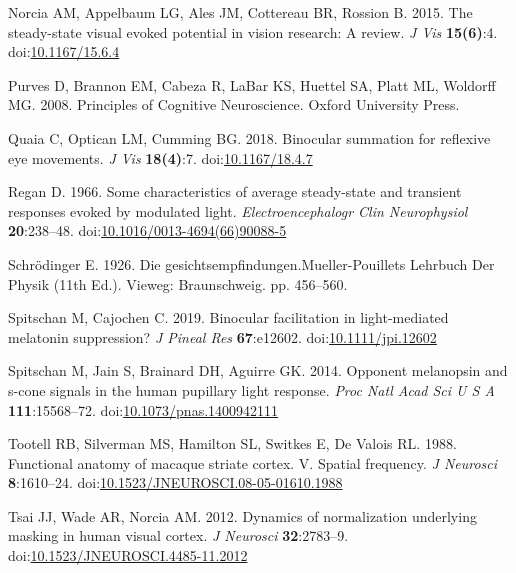 \documentclass[
]{article}
\newlength{\cslhangindent}
\newlength{\cslentryspacingunit} %
\newenvironment{CSLReferences}[2] %
 {%
  \setlength{\parindent}{0pt}
  \ifodd #1
  \let\oldpar\par
  \def\par{\hangindent=\cslhangindent\oldpar}
  \fi
  \setlength{\parskip}{#2\cslentryspacingunit}
 }%
 {}
\begin{document}
\begin{CSLReferences}{1}{0}
\leavevmode{}%
Norcia AM, Appelbaum LG, Ales JM, Cottereau BR, Rossion B. 2015. The steady-state visual evoked potential in vision research: A review. \emph{J Vis} \textbf{15(6)}:4. doi:\href{https://doi.org/10.1167/15.6.4}{10.1167/15.6.4}

\leavevmode{}%
Purves D, Brannon EM, Cabeza R, LaBar KS, Huettel SA, Platt ML, Woldorff MG. 2008. Principles of {Cognitive} {Neuroscience}. Oxford University Press.

\leavevmode{}%
Quaia C, Optican LM, Cumming BG. 2018. Binocular summation for reflexive eye movements. \emph{J Vis} \textbf{18(4)}:7. doi:\href{https://doi.org/10.1167/18.4.7}{10.1167/18.4.7}

\leavevmode{}%
Regan D. 1966. Some characteristics of average steady-state and transient responses evoked by modulated light. \emph{Electroencephalogr Clin Neurophysiol} \textbf{20}:238--48. doi:\href{https://doi.org/10.1016/0013-4694(66)90088-5}{10.1016/0013-4694(66)90088-5}

\leavevmode{}%
Schrödinger E. 1926. Die gesichtsempfindungen.Mueller-Pouillets Lehrbuch Der Physik (11th Ed.). Vieweg: Braunschweig. pp. 456--560.

\leavevmode{}%
Spitschan M, Cajochen C. 2019. Binocular facilitation in light-mediated melatonin suppression? \emph{J Pineal Res} \textbf{67}:e12602. doi:\href{https://doi.org/10.1111/jpi.12602}{10.1111/jpi.12602}

\leavevmode{}%
Spitschan M, Jain S, Brainard DH, Aguirre GK. 2014. Opponent melanopsin and s-cone signals in the human pupillary light response. \emph{Proc Natl Acad Sci U S A} \textbf{111}:15568--72. doi:\href{https://doi.org/10.1073/pnas.1400942111}{10.1073/pnas.1400942111}

\leavevmode{}%
Tootell RB, Silverman MS, Hamilton SL, Switkes E, De Valois RL. 1988. Functional anatomy of macaque striate cortex. V. Spatial frequency. \emph{J Neurosci} \textbf{8}:1610--24. doi:\href{https://doi.org/10.1523/JNEUROSCI.08-05-01610.1988}{10.1523/JNEUROSCI.08-05-01610.1988}

\leavevmode{}%
Tsai JJ, Wade AR, Norcia AM. 2012. Dynamics of normalization underlying masking in human visual cortex. \emph{J Neurosci} \textbf{32}:2783--9. doi:\href{https://doi.org/10.1523/JNEUROSCI.4485-11.2012}{10.1523/JNEUROSCI.4485-11.2012}


\end{CSLReferences}
\end{document}
